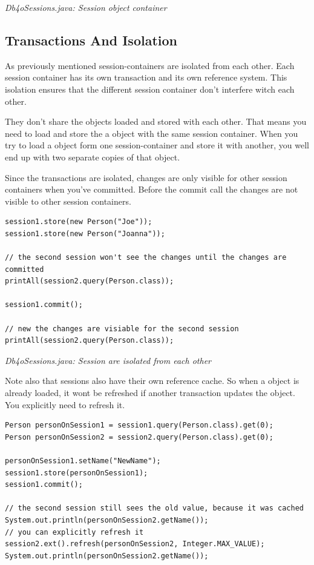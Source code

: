 {\small\itshape Db4oSessions.java: Session object container\par}
\medskip

\subsection*{Transactions And Isolation}

As previously mentioned session-containers are isolated from each other. Each session container has its own transaction and its own reference system. This isolation ensures that the different session container don't interfere witch each other.

They don't share the objects loaded and stored with each other. That means you need to load and store the a object with the same session container. When you try to load a object form one session-container and store it with another, you well end up with two separate copies of that object.

Since the transactions are isolated, changes are only visible for other session containers when you've committed. Before the commit call the changes are not visible to other session containers.

\begin{lstlisting}
session1.store(new Person("Joe"));
session1.store(new Person("Joanna"));

// the second session won't see the changes until the changes are committed
printAll(session2.query(Person.class));

session1.commit();

// new the changes are visiable for the second session
printAll(session2.query(Person.class));
\end{lstlisting}

{\small\itshape Db4oSessions.java: Session are isolated from each other\par}
\medskip

Note also that sessions also have their own reference cache. So when a object is already loaded, it wont be refreshed if another transaction updates the object. You explicitly need to refresh it.

\begin{lstlisting}
Person personOnSession1 = session1.query(Person.class).get(0);
Person personOnSession2 = session2.query(Person.class).get(0);

personOnSession1.setName("NewName");
session1.store(personOnSession1);
session1.commit();

// the second session still sees the old value, because it was cached
System.out.println(personOnSession2.getName());
// you can explicitly refresh it
session2.ext().refresh(personOnSession2, Integer.MAX_VALUE);
System.out.println(personOnSession2.getName());
\end{lstlisting}

